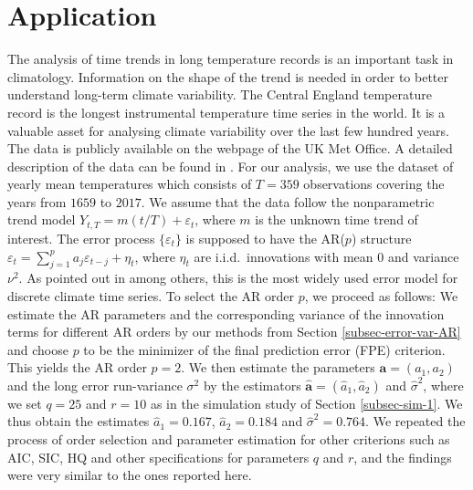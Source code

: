 \begin{enumerate}[label=(\roman*),leftmargin=0.9cm]

\end{enumerate}



\section{Application}\label{sec-data}


The analysis of time trends in long temperature records is an important task in climatology. Information on the shape of the trend is needed in order to better understand long-term climate variability. The Central England temperature record is the longest instrumental temperature time series in the world. It is a valuable asset for analysing climate variability over the last few hundred years. The data is publicly available on the webpage of the UK Met Office. A detailed description of the data can be found in \cite{Parker1992}. For our analysis, we use the dataset of yearly mean temperatures which consists of $T=359$ observations covering the years from $1659$ to $2017$. We assume that the data follow the nonparametric trend model $Y_{t,T} = m(t/T) + \varepsilon_t$, where $m$ is the unknown time trend of interest. The error process $\{ \varepsilon_t \}$ is supposed to have the AR($p$) structure $\varepsilon_t = \sum_{j=1}^p a_j \varepsilon_{t-j} + \eta_t$, where $\eta_t$ are i.i.d.\ innovations with mean $0$ and variance $\nu^2$. As pointed out in \cite{Mudelsee2010} among others, this is the most widely used error model for discrete climate time series. To select the AR order $p$, we proceed as follows: We estimate the AR parameters and the corresponding variance of the innovation terms for different AR orders by our methods from Section \ref{subsec-error-var-AR} and choose $p$ to be the minimizer of the final prediction error (FPE) criterion. This yields the AR order $p = 2$. We then estimate the parameters $\boldsymbol{a} = (a_1,a_2)$ and the long error run-variance $\sigma^2$ by the estimators $\widehat{\boldsymbol{a}} = (\widehat{a}_1,\widehat{a}_2)$ and $\widehat{\sigma}^2$, where we set $q = 25$ and $r =10$ as in the simulation study of Section \ref{subsec-sim-1}. We thus obtain the estimates $\widehat{a}_1 = 0.167$, $\widehat{a}_2 = 0.184$ and $\widehat{\sigma}^2 = 0.764$. We repeated the process of order selection and parameter estimation for other criterions such as AIC, SIC, HQ and other specifications for parameters $q$ and $r$, and the findings were very similar to the ones reported here.


